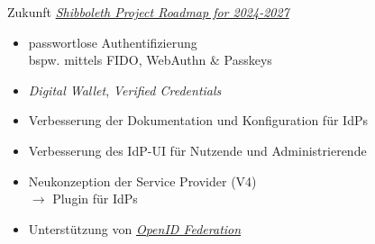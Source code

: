 \begin{frame}{Zukunft}
    \href{https://shibboleth.atlassian.net/wiki/spaces/DEV/pages/3503423489/Project+Roadmap}{\emph{Shibboleth Project Roadmap for 2024-2027}}

    \begin{itemize}
        \item passwortlose Authentifizierung\\bspw. mittels FIDO, WebAuthn \& Passkeys
        \item \emph{Digital Wallet}, \emph{Verified Credentials}
        \item Verbesserung der Dokumentation und Konfiguration für IdPs
        \item Verbesserung des IdP-UI für Nutzende und Administrierende
        \item Neukonzeption der Service Provider (V4)\\$\to$ Plugin für IdPs
        \item Unterstützung von \href{https://openid.net/foundation/}{\emph{OpenID Federation}}~\cite{shibbolethDevelopmentCenterProject2024}
    \end{itemize}
\end{frame}
